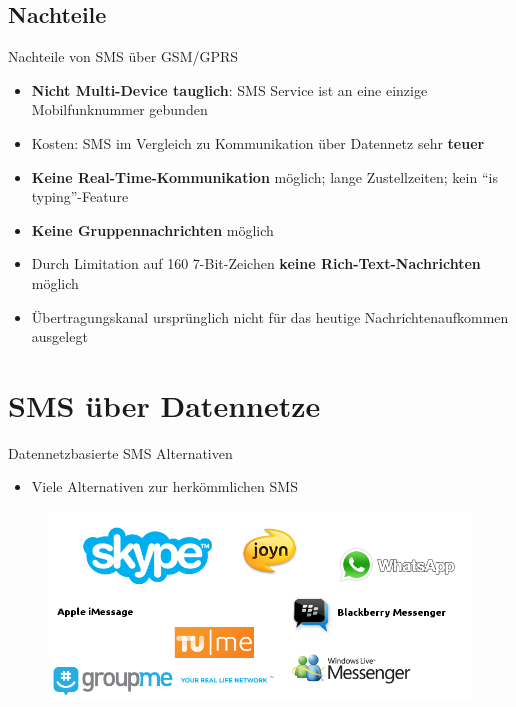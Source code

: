 \documentclass{beamer}
\begin{document}
\subsection{Nachteile}
\begin{frame}{Nachteile von SMS über GSM/GPRS}
	\begin{itemize}
		\item \textbf{Nicht Multi-Device tauglich}: SMS Service ist an eine einzige 
			Mobilfunknummer gebunden
		\item Kosten: SMS im Vergleich zu Kommunikation über Datennetz sehr 
			\textbf{teuer}
		\item \textbf{Keine Real-Time-Kommunikation} möglich; lange Zustellzeiten; 
			kein ``is typing''-Feature
		\item \textbf{Keine Gruppennachrichten} möglich
		\item Durch Limitation auf 160 7-Bit-Zeichen \textbf{keine Rich-Text-Nachrichten} 
			möglich
		\item Übertragungskanal ursprünglich nicht für das heutige 
			Nachrichtenaufkommen ausgelegt
	\end{itemize}
\end{frame}

\section{SMS über Datennetze}
\begin{frame}{Datennetzbasierte SMS Alternativen}
	\begin{itemize}
		\item Viele Alternativen zur herkömmlichen SMS
	\end{itemize}
	\begin{figure}[htm]
		\includegraphics[width=\textwidth]{img/messengers.png}
		\label{messengers}
	\end{figure}
\end{frame}
\end{document}
